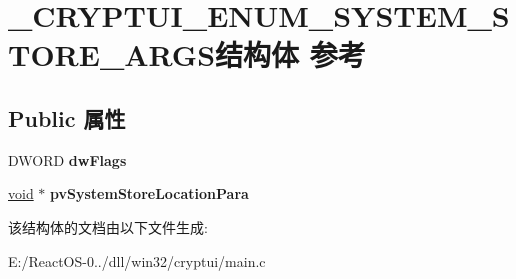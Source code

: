 \hypertarget{struct___c_r_y_p_t_u_i___e_n_u_m___s_y_s_t_e_m___s_t_o_r_e___a_r_g_s}{}\section{\+\_\+\+C\+R\+Y\+P\+T\+U\+I\+\_\+\+E\+N\+U\+M\+\_\+\+S\+Y\+S\+T\+E\+M\+\_\+\+S\+T\+O\+R\+E\+\_\+\+A\+R\+G\+S结构体 参考}
\label{struct___c_r_y_p_t_u_i___e_n_u_m___s_y_s_t_e_m___s_t_o_r_e___a_r_g_s}
\subsection*{Public 属性}
\begin{DoxyCompactItemize}
\item 
\mbox{\label{struct___c_r_y_p_t_u_i___e_n_u_m___s_y_s_t_e_m___s_t_o_r_e___a_r_g_s_adca75c44fb58a8d168125bf68676300a}} 
D\+W\+O\+RD {\bfseries dw\+Flags}
\item 
\mbox{\label{struct___c_r_y_p_t_u_i___e_n_u_m___s_y_s_t_e_m___s_t_o_r_e___a_r_g_s_a951c94ef2b6575216a2e7ead2d8ae289}} 
\hyperlink{interfacevoid}{void} $\ast$ {\bfseries pv\+System\+Store\+Location\+Para}
\end{DoxyCompactItemize}


该结构体的文档由以下文件生成\+:\begin{DoxyCompactItemize}
\item 
E\+:/\+React\+O\+S-\/0../dll/win32/cryptui/main.\+c\end{DoxyCompactItemize}
